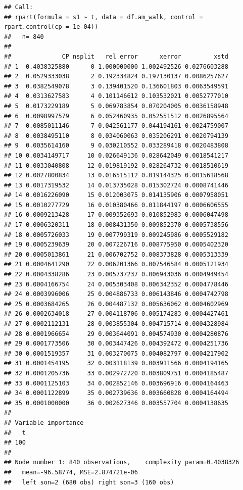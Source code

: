 \documentclass[
]{book}
\begin{document}
\begin{verbatim}
## Call:
## rpart(formula = s1 ~ t, data = df.am_walk, control = rpart.control(cp = 1e-04))
##   n= 840 
## 
##              CP nsplit   rel error      xerror         xstd
## 1  0.4038325880      0 1.000000000 1.002492526 0.0276603288
## 2  0.0529333038      2 0.192334824 0.197130137 0.0086257627
## 3  0.0382549078      3 0.139401520 0.136601803 0.0063549591
## 4  0.0313627583      4 0.101146612 0.103532021 0.0052777010
## 5  0.0173229189      5 0.069783854 0.070204005 0.0036158948
## 6  0.0098997579      6 0.052460935 0.052551512 0.0026895564
## 7  0.0085011146      7 0.042561177 0.044194161 0.0024759007
## 8  0.0038495110      8 0.034060063 0.035206291 0.0020794139
## 9  0.0035614160      9 0.030210552 0.033289418 0.0020483808
## 10 0.0034149717     10 0.026649136 0.028642049 0.0018541217
## 11 0.0033040808     12 0.019819192 0.028264732 0.0018510619
## 12 0.0027800834     13 0.016515112 0.019144325 0.0015618568
## 13 0.0017319532     14 0.013735028 0.015302724 0.0008741446
## 14 0.0016226090     15 0.012003075 0.014135906 0.0007958051
## 15 0.0010277729     16 0.010380466 0.011844197 0.0006606555
## 16 0.0009213428     17 0.009352693 0.010852983 0.0006047498
## 17 0.0006320311     18 0.008431350 0.009852370 0.0005738556
## 18 0.0005726033     19 0.007799319 0.009245986 0.0005529182
## 19 0.0005239639     20 0.007226716 0.008775950 0.0005402320
## 20 0.0005013861     21 0.006702752 0.008373828 0.0005313339
## 21 0.0004641290     22 0.006201366 0.007546584 0.0005121934
## 22 0.0004338286     23 0.005737237 0.006943036 0.0004949454
## 23 0.0004166754     24 0.005303408 0.006342352 0.0004778446
## 24 0.0003996006     25 0.004886733 0.006143846 0.0004742798
## 25 0.0003684265     26 0.004487132 0.005636062 0.0004602969
## 26 0.0002634018     27 0.004118706 0.005174283 0.0004427461
## 27 0.0002112131     28 0.003855304 0.004715714 0.0004328984
## 28 0.0001966654     29 0.003644091 0.004574930 0.0004280876
## 29 0.0001773506     30 0.003447426 0.004392472 0.0004251736
## 30 0.0001519357     31 0.003270075 0.004082797 0.0004217902
## 31 0.0001454195     32 0.003118139 0.003911566 0.0004194165
## 32 0.0001205736     33 0.002972720 0.003809751 0.0004185487
## 33 0.0001125103     34 0.002852146 0.003696916 0.0004164463
## 34 0.0001122899     35 0.002739636 0.003660828 0.0004164494
## 35 0.0001000000     36 0.002627346 0.003557704 0.0004138635
## 
## Variable importance
##   t 
## 100 
## 
## Node number 1: 840 observations,    complexity param=0.4038326
##   mean=-96.58774, MSE=2.874721e-06 
##   left son=2 (680 obs) right son=3 (160 obs)

\end{verbatim}
\end{document}
